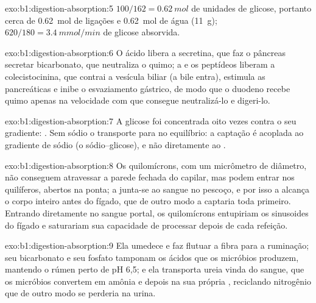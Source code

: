 \begin{solution}{exo:b1:digestion-absorption:5}
$100/162 = \qty{0.62}{mol}$ de unidades de glicose, portanto cerca de
\qty{0.62}{mol} de ligações e \qty{0.62}{mol} de água (\qty{11}{g});
$620/180 = \qty{3.4}{mmol/min}$ de glicose absorvida.
\end{solution}

\begin{solution}{exo:b1:digestion-absorption:6}
O ácido libera a secretina, que faz o pâncreas secretar bicarbonato,
que neutraliza o quimo; a  e os peptídeos liberam a
colecistocinina, que contrai a vesícula biliar (a bile entra),
estimula as  pancreáticas e inibe o esvaziamento gástrico, de
modo que o duodeno recebe quimo apenas na velocidade com que consegue
neutralizá-lo e digeri-lo.
\end{solution}

\begin{solution}{exo:b1:digestion-absorption:7}
A glicose foi concentrada oito vezes contra o seu gradiente:
. Sem sódio o transporte para no equilíbrio: a
captação é acoplada ao gradiente de sódio (o 
sódio--glicose), e não diretamente ao .
\end{solution}

\begin{solution}{exo:b1:digestion-absorption:8}
Os quilomícrons, com um micrômetro de diâmetro, não conseguem
atravessar a parede fechada do capilar, mas podem entrar nos
quilíferos, abertos na ponta; a  junta-se ao sangue no pescoço, e
por isso a  alcança o corpo inteiro antes do fígado, que de
outro modo a captaria toda primeiro. Entrando diretamente no sangue
portal, os quilomícrons entupiriam os sinusoides do fígado e
saturariam sua capacidade de processar  depois de cada refeição.
\end{solution}

\begin{solution}{exo:b1:digestion-absorption:9}
Ela umedece e faz flutuar a fibra para a ruminação; seu bicarbonato e
seu fosfato tamponam os ácidos que os micróbios produzem, mantendo o
rúmen perto de pH 6,5; e ela transporta ureia vinda do sangue, que os
micróbios convertem em amônia e depois na sua própria ,
reciclando nitrogênio que de outro modo se perderia na urina.
\end{solution}

